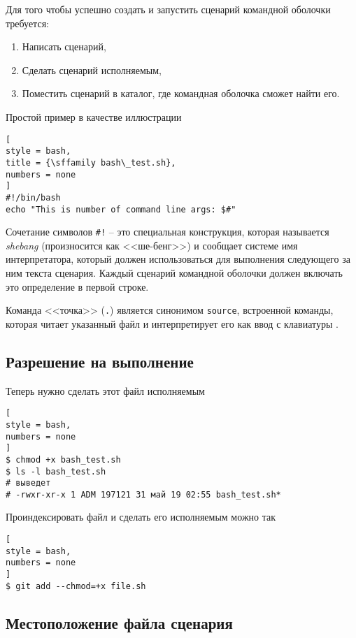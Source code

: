 \documentclass[%
	11pt,
	a4paper,
	utf8,
		]{article}
\begin{document}
Для того чтобы успешно создать и запустить сценарий командной оболочки требуется:
\begin{enumerate}
	\item Написать сценарий,
	
	\item Сделать сценарий исполняемым,
	
	\item Поместить сценарий в каталог, где командная оболочка сможет найти его.
\end{enumerate}

Простой пример в качестве иллюстрации
\begin{lstlisting}[
style = bash,
title = {\sffamily bash\_test.sh},
numbers = none
]
#!/bin/bash
echo "This is number of command line args: $#"
\end{lstlisting}

Сочетание символов \verb|#!| -- это специальная конструкция, которая называется \emph{shebang} (произносится как <<ше-бенг>>) и сообщает системе имя интерпретатора, который должен использоваться для выполнения следующего за ним текста сценария. Каждый сценарий командной оболочки должен включать это определение в первой строке.

Команда <<точка>> (\texttt{.}) является синонимом \texttt{source}, встроенной команды, которая читает указанный файл и интерпретирует его как ввод с клавиатуры \cite[]{shotts:linux-2017}.

\subsection{Разрешение на выполнение}

Теперь нужно сделать этот файл исполняемым
\begin{lstlisting}[
style = bash,
numbers = none
]
$ chmod +x bash_test.sh
$ ls -l bash_test.sh
# выведет
# -rwxr-xr-x 1 ADM 197121 31 май 19 02:55 bash_test.sh*
\end{lstlisting}

Проиндексировать файл и сделать его исполняемым можно так
\begin{lstlisting}[
style = bash,
numbers = none
]
$ git add --chmod=+x file.sh
\end{lstlisting}

\subsection{Местоположение файла сценария}
\end{document}
